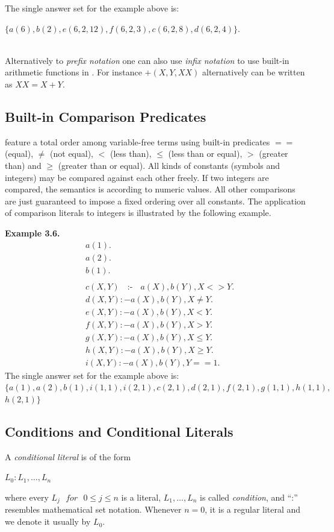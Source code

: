 \documentclass[14pt,a4paper, titlepage]{article}
\DeclareMathOperator{\leftimpl}{:-}
\begin{document}
The single answer set for the example above is:\\ \centerline{$\mathit{\{a(6),b(2),e(6,2,12),f(6,2,3),c(6,2,8),d(6,2,4)\}}$.}
\\Alternatively to \emph{prefix notation} one can also use \emph{infix notation} to use built-in arithmetic functions in \dlvhex{}. For instance $\mathit{+(X, Y, XX)}$ alternatively can be written as $\mathit{XX=X+Y}$. 

\subsection{Built-in Comparison Predicates}
\dlvhex{} feature a total order among variable-free terms using built-in predicates $==$ (equal), $\neq$ (not equal), $<$ (less than), $\leq$ (less than or equal), $>$ (greater than) and $\geq$ (greater than or equal). All kinds of constants (symbols and integers) may be compared against each other freely. If two integers are compared, the semantics is according to numeric values. All other comparisons are just guaranteed to impose a fixed ordering over all constants. The application of comparison literals to integers is illustrated by the following example.

\textbf{Example 3.6.}
\begin{align*}
& a(1). \\
& a(2). \\
& b(1). \\
& \\
& c(X,Y) \text{ } \leftimpl \text{ } a(X), b(Y), X <> Y. \\
& d(X,Y) :- a(X), b(Y), X \neq Y. \\
& e(X,Y) :- a(X), b(Y), X < Y. \\
& f(X,Y) :- a(X), b(Y), X > Y. \\
& g(X,Y) :- a(X), b(Y), X \leq Y. \\
& h(X,Y) :- a(X), b(Y), X \geq Y. \\
& i(X,Y) :- a(X), b(Y), Y == 1. 
\end{align*}
The single answer set for the example above is:\\ $\mathit{\{a(1),a(2),b(1),i(1,1),i(2,1),c(2,1),d(2,1),f(2,1),g(1,1),h(1,1)},$\\
$\mathit{h(2,1)}\}$

\subsection{Conditions and Conditional Literals}
A \emph{conditional literal} is of the form \\ \centerline{$L_0:L_1,\dots,L_n$} where every $\mathit{L_j \text{ } for \text{ } 0 \leq j \leq n}$ is a literal, $L_1,\dots,L_n$ is called \emph{condition}, and \enquote{:} resembles mathematical set notation. Whenever $\mathit{n = 0}$, it is a regular literal and we denote it usually by $L_0$.
\end{document}
